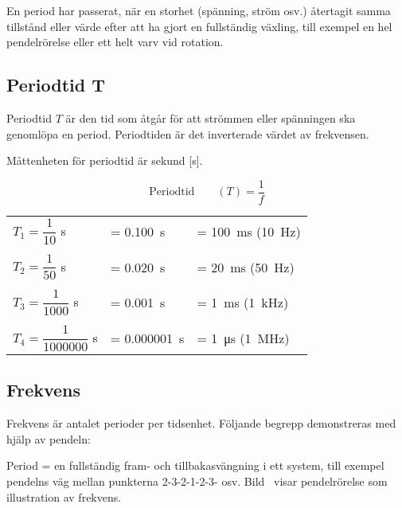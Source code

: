 En period har passerat, när en storhet (spänning, ström osv.) återtagit samma
tillstånd eller värde efter att ha gjort en fullständig växling, till exempel en
hel pendelrörelse eller ett helt varv vid rotation.

\newpage
\subsection{Periodtid T}

Periodtid \(T\) är den tid som åtgår för att strömmen eller spänningen ska
genomlöpa en period. Periodtiden är det inverterade värdet av frekvensen.

Måttenheten för periodtid är sekund [s].

$$\text{Periodtid} \qquad (T) = \dfrac{1}{f}$$

\begin{exempelbox}
\begin{small}
\noindent
\begin{tabular}{@{}lll}
\(T_1=\dfrac{1}{10}\) s & = \qty{0,100}{\second} & = \qty{100}{\milli\second} (\qty{10}{\hertz})\\
\\
\(T_2=\dfrac{1}{50}\) s & = \qty{0,020}{\second} & = \qty{20}{\milli\second} (\qty{50}{\hertz})\\
\\
\(T_3=\dfrac{1}{1000}\) s & = \qty{0,001}{\second} & = \qty{1}{\milli\second} (\qty{1}{\kilo\hertz})\\
\\
\(T_4=\dfrac{1}{1000000}\) s & = \qty{0,000001}{\second} & = \qty{1}{\micro\second} (\qty{1}{\mega\hertz})\\
\end{tabular}
\end{small}
\end{exempelbox}

\subsection{Frekvens}
\label{frekvens}

Frekvens är antalet perioder per tidsenhet.
Följande begrepp demonstreras med hjälp av pendeln:

Period = en fullständig fram- och tillbakasvängning i ett system, till exempel
pendelns väg mellan punkterna 2-3-2-1-2-3- osv.
Bild~ visar pendelrörelse som illustration av frekvens.

